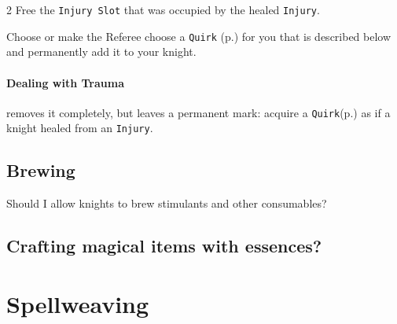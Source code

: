 \documentclass{osr-template/zine}
\begin{document}
\begin{multicols*}{2}
Free the \texttt{Injury Slot} that was occupied by the healed \texttt{Injury}.

Choose or make the Referee choose a \texttt{Quirk} (p.\pageref*{sec:quirks}) for you that is described below and permanently add it to your knight.

\paragraph{Dealing with Trauma} removes it completely, but leaves a permanent mark: acquire a \texttt{Quirk}(p.\pageref*{sec:quirks}) as if a knight healed from an \texttt{Injury}.

\subsection*{Brewing}

Should I allow knights to brew stimulants and other consumables?

\newcolumn

\subsection*{Crafting magical items with essences?}

\end{multicols*}

\newpage
\section*{\centering \fontsize{35}{45}\selectfont Spellweaving} \label{sec:spellweaving}
\vspace*{0.4 cm}
\end{document}
